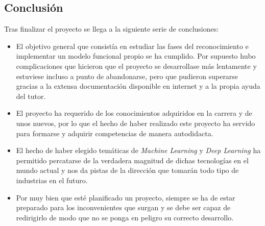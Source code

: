 
\subsection{Conclusión}
Tras finalizar el proyecto se llega a la siguiente serie de conclusiones:
\begin{itemize}
    \item El objetivo general que consistía en estudiar las fases del reconocimiento e implementar un modelo funcional propio se ha cumplido. Por supuesto hubo complicaciones que hicieron que el proyecto se desarrollase más lentamente y estuviese incluso a punto de abandonarse, pero que pudieron superarse gracias a la extensa documentación disponible en internet y a la propia ayuda del tutor.
    \item El proyecto ha requerido de los conocimientos adquiridos en la carrera y de unos nuevos, por lo que el hecho de haber realizado este proyecto ha servido para formarse y adquirir competencias de manera autodidacta.
    \item El hecho de haber elegido temáticas de \emph{Machine Learning} y \emph{Deep Learning} ha permitido percatarse de la verdadera magnitud de dichas tecnologías en el mundo actual y nos da pistas de la dirección que tomarán todo tipo de industrias en el futuro.
    \item Por muy bien que esté planificado un proyecto, siempre se ha de estar preparado para los inconvenientes que surgan y se debe ser capaz de redirigirlo de modo que no se ponga en peligro su correcto desarrollo.
\end{itemize}
